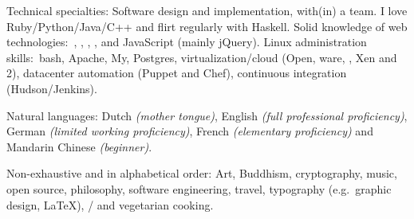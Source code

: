 \documentclass[10pt,letterpaper]{article}
\begin{document}
\spacedhrule{0.5em}{-0.4em} %



\inlineheadsection %
{Technical specialties:}
{Software design and implementation, with(in) a team. I love Ruby/Python/Java/C++ and flirt regularly with Haskell. Solid knowledge of web technologies:\ , , , ,  and JavaScript (mainly jQuery). Linux administration skills:\ bash, Apache, My, Postgres, virtualization/cloud (Open, ware, , Xen and 2), datacenter automation (Puppet and Chef), continuous integration (Hudson/Jenkins).}


\inlineheadsection %
{Natural languages:}
{Dutch \textit{(mother tongue)}, English \textit{(full professional proficiency)}, German \textit{(limited working proficiency)}, French \textit{(elementary proficiency)} and Mandarin Chinese \textit{(beginner)}.}


\spacedhrule{1.6em}{-0.4em} %



\inlineheadsection %
{Non-exhaustive and in alphabetical order:}
{Art, Buddhism, cryptography, music, open source, philosophy, software engineering, travel, typography (e.g.\ graphic design, \LaTeX), / and vegetarian cooking.}

\end{document}
